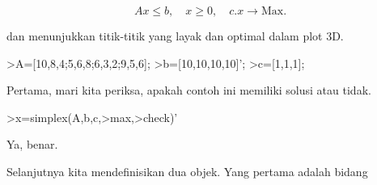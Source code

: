 \documentclass[a4paper,10pt]{article}
\begin{document}
\begin{eulernotebook}
\begin{eulercomment}
\end{eulercomment}
\begin{eulerformula}
\[
Ax \le b, \quad x \ge 0, \quad c.x \to \text{Max.}
\]
\end{eulerformula}
\begin{eulercomment}
dan menunjukkan titik-titik yang layak dan optimal dalam plot 3D.
\end{eulercomment}
\begin{eulerprompt}
>A=[10,8,4;5,6,8;6,3,2;9,5,6];
>b=[10,10,10,10]';
>c=[1,1,1];
\end{eulerprompt}
\begin{eulercomment}
Pertama, mari kita periksa, apakah contoh ini memiliki solusi atau
tidak.
\end{eulercomment}
\begin{eulerprompt}
>x=simplex(A,b,c,>max,>check)'
\end{eulerprompt}
\begin{euleroutput}
  [0,  1,  0.5]
\end{euleroutput}
\begin{eulercomment}
Ya, benar.

Selanjutnya kita mendefinisikan dua objek. Yang pertama adalah bidang


\end{eulercomment}
\end{eulernotebook}
\end{document}
